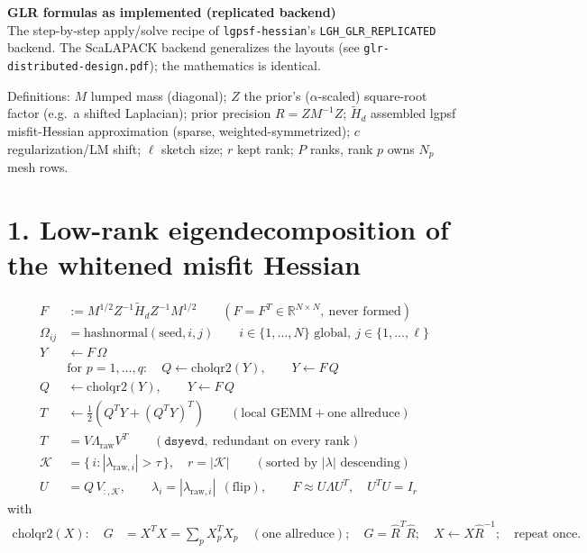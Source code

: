 \documentclass[11pt]{article}
\begin{document}
\begin{center}\textbf{GLR formulas as implemented (replicated backend)}\\[2pt]
\small The step-by-step apply/solve recipe of \texttt{lgpsf-hessian}'s
\texttt{LGH\_GLR\_REPLICATED} backend.  The ScaLAPACK backend generalizes the
layouts (see \texttt{glr-distributed-design.pdf}); the mathematics is identical.
\end{center}

Definitions: $M$ lumped mass (diagonal); $Z$ the prior's ($\alpha$-scaled)
square-root factor (e.g.\ a shifted Laplacian); prior precision $R = Z M^{-1} Z$;
$\widetilde{H}_d$ assembled lgpsf misfit-Hessian approximation (sparse,
weighted-symmetrized); $c$ regularization/LM shift; $\ell$ sketch size;
$r$ kept rank; $P$ ranks, rank $p$ owns $N_p$ mesh rows.

\section*{1. Low-rank eigendecomposition of the whitened misfit Hessian}
\begin{align}
F &:= M^{1/2} Z^{-1} \widetilde{H}_d Z^{-1} M^{1/2}
      \qquad (F = F^T \in \mathbb{R}^{N\times N},\ \text{never formed})\\
\Omega_{ij} &= \mathrm{hashnormal}(\mathrm{seed}, i, j)
      \qquad i \in \{1,\dots,N\} \text{ global},\ j \in \{1,\dots,\ell\}\\
Y &\leftarrow F\,\Omega\\
&\text{for } p = 1,\dots,q:\quad
      Q \leftarrow \mathrm{cholqr2}(Y), \qquad Y \leftarrow F\,Q\\
Q &\leftarrow \mathrm{cholqr2}(Y), \qquad Y \leftarrow F\,Q\\
T &\leftarrow \tfrac{1}{2}\left(Q^T Y + (Q^T Y)^T\right)
      \qquad (\text{local GEMM} + \text{one allreduce})\\
T &= V \Lambda_{\mathrm{raw}} V^T \qquad (\texttt{dsyevd},\ \text{redundant on every rank})\\
\mathcal{K} &= \{\,i : |\lambda_{\mathrm{raw},i}| > \tau\,\},\quad r = |\mathcal{K}|
      \qquad (\text{sorted by } |\lambda| \text{ descending})\\
U &= Q\, V_{:,\mathcal{K}}, \qquad
      \lambda_i = |\lambda_{\mathrm{raw},i}| \ \ (\text{flip}), \qquad
      F \approx U \Lambda U^T,\quad U^T U = I_r
\end{align}
with
\begin{align}
\mathrm{cholqr2}(X):\quad
G &= X^T X = \textstyle\sum_{p} X_p^T X_p \quad (\text{one allreduce});\quad
G = \widehat{R}^T \widehat{R};\quad
X \leftarrow X \widehat{R}^{-1}; \quad \text{repeat once.}
\end{align}
\end{document}

